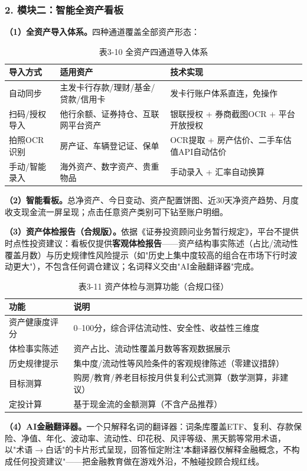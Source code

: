 \documentclass[12pt,a4paper]{ctexart}
\newcommand{\sub}[1]{\subsubsection*{#1}}
\begin{document}
\sub{2. 模块二：智能全资产看板}
\textbf{（1）全资产导入体系。}四种通道覆盖全部资产形态：

\begin{table}[htbp]
\centering
\begin{tabular}{p{2.8cm}p{3.4cm}p{6.4cm}}
\toprule
\textbf{导入方式} & \textbf{适用资产} & \textbf{技术实现} \\
\midrule
自动同步 & 主发卡行存款/理财/基金/贷款/信用卡 & 发卡行账户体系直连，免操作 \\
扫码/授权导入 & 他行余额、证券持仓、互联网平台资产 & 银联授权 + 券商截图OCR + 平台开放授权 \\
拍照OCR识别 & 房产证、车辆登记证、保单 & OCR提取 + 房产估价、二手车估值API自动估价 \\
手动/智能录入 & 海外资产、数字资产、贵重物品 & 手动录入 + 汇率自动换算 \\
\bottomrule
\end{tabular}
\caption*{表3-10 \quad 全资产四通道导入体系}
\end{table}

\textbf{（2）智能看板。}总净资产、今日变动、资产配置饼图、近30天净资产趋势、月度收支现金流一屏呈现；点击任意资产类别可下钻至账户明细。

\textbf{（3）资产体检报告（合规版）。}依据《证券投资顾问业务暂行规定》，平台不提供时点性投资建议：看板仅提供\textbf{客观体检报告}——资产结构事实陈述（占比/流动性覆盖月数）与历史规律性风险提示（如"历史上集中度较高的组合在市场下行时波动更大"），不包含任何调仓建议；名词释义交由"AI金融翻译器"完成。

\begin{table}[htbp]
\centering
\begin{tabular}{p{3.4cm}p{9.2cm}}
\toprule
\textbf{功能} & \textbf{说明} \\
\midrule
资产健康度评分 & 0--100分，综合评估流动性、安全性、收益性三维度 \\
体检事实陈述 & 资产占比、流动性覆盖月数等客观数据展示 \\
历史规律提示 & 集中度/流动性等风险条件的客观规律陈述（零建议措辞） \\
目标测算 & 购房/教育/养老目标按月供复利公式测算（数学测算，非建议） \\
定投计算 & 基于现金流的金额测算（不含产品推荐） \\
\bottomrule
\end{tabular}
\caption*{表3-11 \quad 资产体检与测算功能（合规口径）}
\end{table}

\textbf{（4）AI金融翻译器。}一个只解释名词的翻译器：词条库覆盖ETF、复利、存款保险、净值、年化、波动率、流动性、印花税、风评等级、黑天鹅等常用术语，以"术语$\rightarrow$白话"的卡片形式呈现，回答恒定附注"本翻译器仅解释金融概念，不构成任何投资建议"——把金融教育做在游戏外沿，不触碰投顾合规红线。
\end{document}
